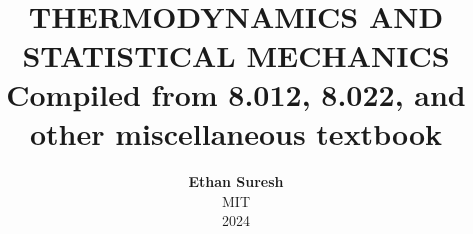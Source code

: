 \documentclass[openany,oneside]{book}
\begin{document}

\title{ \normalsize \textsc{}
		\\ [2.0cm]
		\HRule{1.5pt} \\
		\LARGE \textbf{\uppercase{ Thermodynamics and Statistical Mechanics}
		\HRule{2.0pt} \\ [0.6cm] \LARGE{Compiled from 8.012, 8.022, and other miscellaneous textbook} \vspace*{10\baselineskip}}
		}
\date{}
\author{\textbf{Ethan Suresh} \\
		MIT \\
		2024}

\maketitle
\newpage

\tableofcontents
\newpage









\end{document}
